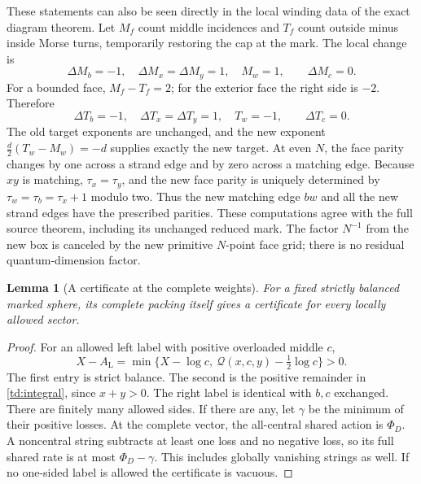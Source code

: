 \documentclass[11pt]{article}
\numberwithin{equation}{section}
\newtheorem{lemma}[theorem]{Lemma}
\theoremstyle{definition}
\newcommand{\Lft}{\mathrm L}
\newcommand{\calQ}{\mathcal Q}
\begin{document}
These statements can also be seen directly in the local winding
data of the exact diagram theorem. Let \(M_f\) count middle
incidences and \(T_f\) count outside minus inside Morse turns,
temporarily restoring the cap at the mark. The local change is
\[
 \Delta M_b=-1,\quad \Delta M_x=\Delta M_y=1,\quad M_w=1,
 \qquad \Delta M_c=0.
\]
For a bounded face, \(M_f-T_f=2\); for the exterior face the
right side is \(-2\). Therefore
\[
 \Delta T_b=-1,\quad \Delta T_x=\Delta T_y=1,\quad T_w=-1,
 \qquad \Delta T_c=0.
\]
The old target exponents are unchanged, and the new exponent
\(\frac d2(T_w-M_w)=-d\) supplies exactly the new target.
At even \(N\), the face parity changes by one across a strand edge
and by zero across a matching edge. Because \(xy\) is matching,
\(\tau_x=\tau_y\), and the new face parity is uniquely determined by
\(\tau_w=\tau_b=\tau_x+1\) modulo two. Thus the new matching
edge \(bw\) and all the new strand edges have the prescribed
parities. These computations agree with the full source theorem,
including its unchanged reduced mark. The factor $N^{-1}$ from the new box is canceled by the new primitive \(N\)-point face grid;
there is no residual quantum-dimension factor.

\begin{lemma}[A certificate at the complete weights]\label{td:certificate}
For a fixed strictly balanced marked sphere, its complete packing
itself gives a certificate for every locally allowed sector.
\end{lemma}
\begin{proof}
For an allowed left label with positive overloaded middle \(c\),
\[
 X-A_{\Lft}=
 \min\{X-\log c,\ \calQ(x,c,y)-\tfrac12\log c\}>0.
\]
The first entry is strict balance. The second is the positive
remainder in \eqref{td:integral}, since \(x+y>0\).
The right label is identical with \(b,c\) exchanged. There are
finitely many allowed sides. If there are any, let \(\gamma\)
be the minimum of their positive losses. At the complete vector,
the all-central shared action is \(\Phi_D\). A noncentral string
subtracts at least one loss and no negative loss, so its full
shared rate is at most \(\Phi_D-\gamma\).
This includes globally vanishing strings as well. If no one-sided
label is allowed the certificate is vacuous.
\end{proof}
\end{document}
